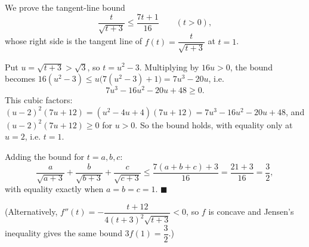 We prove the tangent-line bound
\[
\dfrac{t}{\sqrt{t+3}}\le\dfrac{7t+1}{16}\qquad(t>0),
\]
whose right side is the tangent line of $f(t)=\dfrac{t}{\sqrt{t+3}}$ at $t=1$.

Put $u=\sqrt{t+3}>\sqrt3$, so $t=u^2-3$. Multiplying by $16u>0$, the bound becomes $16(u^2-3)\le u\bigl(7(u^2-3)+1\bigr)=7u^3-20u$, i.e.
\[
7u^3-16u^2-20u+48\ge0 .
\]
This cubic factors: $(u-2)^2(7u+12)=(u^2-4u+4)(7u+12)=7u^3-16u^2-20u+48$, and $(u-2)^2(7u+12)\ge0$ for $u>0$. So the bound holds, with equality only at $u=2$, i.e. $t=1$.

Adding the bound for $t=a,b,c$:
\[
\dfrac{a}{\sqrt{a+3}}+\dfrac{b}{\sqrt{b+3}}+\dfrac{c}{\sqrt{c+3}}\le\dfrac{7(a+b+c)+3}{16}=\dfrac{21+3}{16}=\dfrac{3}{2} ,
\]
with equality exactly when $a=b=c=1$. $\blacksquare$

(Alternatively, $f''(t)=-\dfrac{t+12}{4(t+3)^2\sqrt{t+3}}<0$, so $f$ is concave and Jensen's inequality gives the same bound $3f(1)=\dfrac{3}{2}$.)
